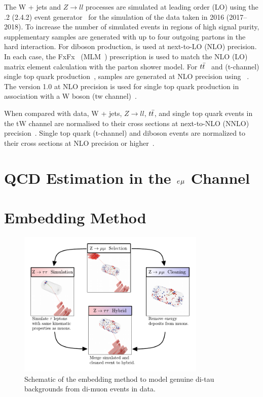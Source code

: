 The W + jets and $Z\rightarrow ll$ processes are simulated at leading order (LO) using the .2 (2.4.2) event generator~\cite{Alwall:2011uj,Alwall:2014hca} for the simulation of the data taken in 2016 (2017--2018). 
To increase the number of simulated events in regions of high signal purity, supplementary samples are generated with up to four outgoing partons in the hard interaction. 
For diboson production, \MGvATNLO is used at next-to-LO (NLO) precision. 
In each case, the FxFx~\cite{Frederix:2012ps} (MLM~\cite{Alwall:2007fs})  prescription is used to match the NLO (LO) matrix element calculation with the parton shower model. 
For $t\bar{t}$~\cite{Alioli:2011as} and (t-channel) single top quark production~\cite{Frederix:2012dh}, samples are generated at NLO precision using ~\cite{Nason:2004rx,Frixione:2007vw,Alioli:2010xd,Jezo2015aia}. 
The \POWHEG version 1.0 at NLO precision is used for single top quark production in association with a W boson (tw channel)~\cite{Re:2010bp}. 

When compared with data, W + jets, $Z\rightarrow ll$, $t\bar{t}$, and single top quark events in the tW channel are normalised to their cross sections at next-to-NLO (NNLO) precision~\cite{Melnikov:2006kv,Czakon:2011xx,Kidonakis:2013zqa}. 
Single top quark (t-channel) and diboson events are normalized to their cross sections at NLO precision or higher~\cite{Kidonakis:2013zqa,Campbell:2011bn,Gehrmann:2014fva}.



\section{QCD Estimation in the $e_{}\mu_{}$ Channel}
\label{sec:qcd}

\section{Embedding Method}
\label{sec:embedding}

\begin{figure}[!hbtp]
\centering
    \includegraphics[width=0.8\textwidth]{Figures/Embedding_Diagram.pdf}
\caption{Schematic of the embedding method to model genuine di-tau backgrounds from di-muon events in data.}
\label{fig:embedding}
\end{figure}

